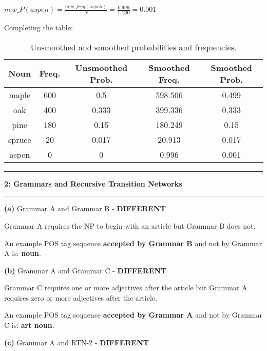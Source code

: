 \documentclass[11pt]{article}
\newcommand\question[2]{\vspace{.25in}\hrule\textbf{#1: #2}\vspace{.5em}\hrule\vspace{.10in}}
\renewcommand\part[1]{\vspace{.10in}\textbf{(#1)}}
\begin{document}
\qquad$new\_P(aspen) = \frac{new\_freq(aspen)}{N} = \frac{0.996}{1,200} = 0.001$

Completing the table:

\begin{table}[H]
\centering
\begin{tabular}{| c | c | c | | c | c |}
\hline
\textbf{Noun} & \textbf{Freq.} & \textbf{Unsmoothed Prob.} & \textbf{Smoothed Freq.} & \textbf{Smoothed Prob.}\\
\hline
\hline
maple & 600 & 0.5 & 598.506 & 0.499 \\
\hline
oak & 400 & 0.333 & 399.336 & 0.333 \\
\hline
pine & 180 & 0.15 & 180.249 & 0.15 \\
\hline
spruce & 20 & 0.017 & 20.913 & 0.017 \\
\hline
aspen & 0 & 0 & 0.996 & 0.001 \\ 
\hline
\end{tabular}
\caption{Unsmoothed and smoothed probabilities and frequencies.}
\end{table}
\newpage

\question{2}{Grammars and Recursive Transition Networks}

\part{a} Grammar A and Grammar B - \textbf{DIFFERENT}

Grammar A requires the NP to begin with an article but Grammar B does not. 

An example POS tag sequence \textbf{accepted by Grammar B} and not by Grammar A is: \textbf{noun}.\newline

\part{b} Grammar A and Grammar C - \textbf{DIFFERENT}

Grammar C requires one or more adjectives after the article but Grammar A requires zero or more adjectives after the article. 

An example POS tag sequence \textbf{accepted by Grammar A} and not by Grammar C is: \textbf{art noun}. \newline

\part{c} Grammar A and RTN-2 - \textbf{DIFFERENT}
\end{document}
